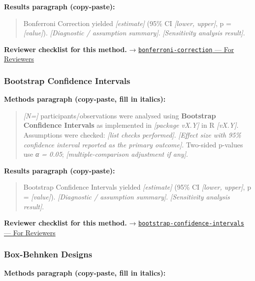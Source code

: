 \documentclass[
]{article}
\begin{document}
\textbf{Results paragraph (copy-paste):}

\begin{quote}
Bonferroni Correction yielded \emph{{[}estimate{]}} (95\% CI
\emph{{[}lower, upper{]}}, p = \emph{{[}value{]}}). \emph{{[}Diagnostic
/ assumption summary{]}}. \emph{{[}Sensitivity analysis result{]}}.
\end{quote}

\textbf{Reviewer checklist for this method.} →
\href{../chapters/04-inferential/bonferroni-correction.Rmd\#for-reviewers}{\texttt{bonferroni-correction}
--- For Reviewers}

\subsubsection{Bootstrap Confidence
Intervals}\label{bootstrap-confidence-intervals}

\textbf{Methods paragraph (copy-paste, fill in italics):}

\begin{quote}
\emph{{[}N={]}} participants/observations were analysed using
\textbf{Bootstrap Confidence Intervals} as implemented in
\emph{{[}package vX.Y{]}} in R \emph{{[}vX.Y{]}}. Assumptions were
checked: \emph{{[}list checks performed{]}}. \emph{{[}Effect size with
95\% confidence interval reported as the primary outcome{]}}. Two-sided
p-values use \emph{α = 0.05}; \emph{{[}multiple-comparison adjustment if
any{]}}.
\end{quote}

\textbf{Results paragraph (copy-paste):}

\begin{quote}
Bootstrap Confidence Intervals yielded \emph{{[}estimate{]}} (95\% CI
\emph{{[}lower, upper{]}}, p = \emph{{[}value{]}}). \emph{{[}Diagnostic
/ assumption summary{]}}. \emph{{[}Sensitivity analysis result{]}}.
\end{quote}

\textbf{Reviewer checklist for this method.} →
\href{../chapters/04-inferential/bootstrap-confidence-intervals.Rmd\#for-reviewers}{\texttt{bootstrap-confidence-intervals}
--- For Reviewers}

\subsubsection{Box-Behnken Designs}\label{box-behnken-designs}

\textbf{Methods paragraph (copy-paste, fill in italics):}
\end{document}
